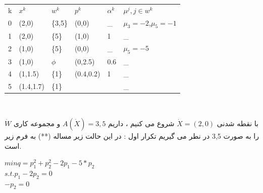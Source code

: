 \documentclass{article}
\begin{document}
\centering
\begin{tabular}{l l l l l l}
k & $x^k$     & $w^k$               & $p^k$     & $\alpha^k$ & $\mu^j , j\in w^k$                                \\
0 & (2,0)     & \{3,5\}             & (0,0)     & \_         & $\mu_3=-2$,$\mu_5=-1$ \\
1 & (2,0)     & \{5\}               & (1,0)     & 1          & \_                                                \\
2 & (1,0)     & \{5\}               & (0,0)     & \_         &$\mu_5=-5$                          \\
3 & (1,0)     & $\phi$              & (0,2.5)   & 0.6        & \_                                                \\
4 & (1,1.5)   & \{1\}               & (0.4,0.2) & 1          & \_                                                \\
5 & (1.4,1.7) & \{1\}               &           &            & \_                                               
\end{tabular}\\
\begin{flushright}


\pagebreak
با نقطه شدنی
$\dot{X}=(2,0)$
شروع می کنیم ، داریم
$A(\dot{X})={3,5}$
و مجموعه کاری 
$\dot{W}$
را به صورت {3,5}
در نطر می گیریم
تکرار اول : در این حالت زیر مساله 
(**)
به فرم زیر است.\\
\end{flushright}

$min  q=p_1^2+p_2^2-2p_1-5*p_2$\\
$s.t. p_1-2p_2=0$\\
$-p_2=0$
\end{document}
